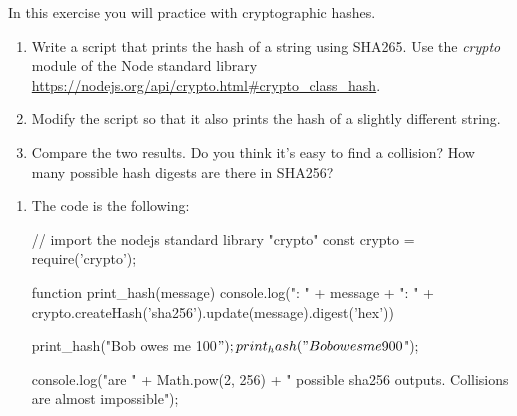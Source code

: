 
\begin{Exercise}[label={basic-js-crypto-sha256}]
In this exercise you will practice with cryptographic hashes.

\begin{enumerate}[1.]
\item Write a script that prints the hash of a string using SHA265. 
Use the \textit{crypto} module of the Node standard library \url{https://nodejs.org/api/crypto.html#crypto_class_hash}.

\item Modify the script so that it also prints 
the hash of a slightly different string.
\item Compare the two results. 
Do you think it's easy to find a collision? 
How many possible hash digests are there in SHA256?

\end{enumerate}
\end{Exercise}

\begin{Answer}[ref={basic-js-crypto-sha256}]
\begin{enumerate}[1.]
\item The code is the following: 

\begin{js}
// import the nodejs standard library "crypto"
const crypto = require('crypto');


function print_hash(message) {
    console.log("\nMessage: " + message +
        "\nHASH: " + 
        crypto.createHash('sha256').update(message).digest('hex'))
}

print_hash("Bob owes me 100$");
print_hash("Bob owes me 900$");

console.log("\nThere are " + Math.pow(2, 256) 
+ " possible sha256 outputs. Collisions are almost impossible");
\end{js}
\end{enumerate}
\end{Answer}



